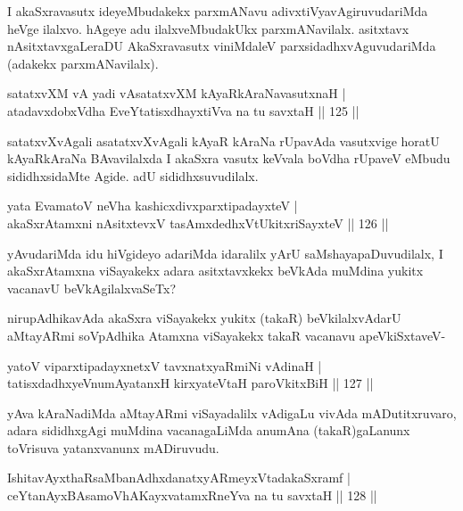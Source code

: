 \begin{artha}
I akaSxravasutx ideyeMbudakekx parxmANavu adivxtiVyavAgiruvudariMda heVge ilalxvo. hAgeye adu ilalxveMbudakUkx parxmANavilalx. asitxtavx nAsitxtavxgaLeraDU AkaSxravasutx viniMdaleV parxsidadhxvAguvudariMda (adakekx parxmANavilalx).
\end{artha}

\begin{shl}
satatxvXM vA yadi vA\s satatxvXM kAyaRkAraNavasutxnaH |\\
atadavxdobxVdha EveYtatisxdhayxtiVva na tu savxtaH \hfill || 125 ||
\end{shl}

\begin{artha}%
satatxvXvAgali asatatxvXvAgali kAyaR kAraNa rUpavAda vasutxvige horatU kAyaRkAraNa BAvavilalxda I akaSxra vasutx keVvala boVdha rUpaveV eMbudu sididhxsidaMte Agide. adU sididhxsuvudilalx.
\end{artha}


\begin{shl}
yata EvamatoV neVha kashicxdivxparxtipadayxteV |\\
akaSxrAtamxni nAsitxtevxV tasAmxdedhxVtUkitxriSayxteV \hfill || 126 ||
\end{shl}

\begin{artha}
yAvudariMda idu hiVgideyo adariMda idaralilx yArU saMshayapaDuvudilalx, I akaSxrAtamxna viSayakekx adara asitxtavxkekx beVkAda muMdina yukitx vacanavU beVkAgilalxvaSeTx?

nirupAdhikavAda akaSxra viSayakekx yukitx (takaR) beVkilalxvAdarU aMtayARmi soVpAdhika Atamxna viSayakekx takaR vacanavu apeVkiSxtaveV-
\end{artha}

\begin{shl}
yatoV viparxtipadayxnetxV tavxnatxyaRmiNi vAdinaH |\\
tatisxdadhxyeV\s numAyatanxH kirxyateV\s taH paroVkitxBiH \hfill || 127 ||
\end{shl}

\begin{artha}
yAva kAraNadiMda aMtayARmi viSayadalilx vAdigaLu vivAda mADutitxruvaro, adara sididhxgAgi muMdina vacanagaLiMda anumAna (takaR)gaLanunx toVrisuva yatanxvanunx mADiruvudu.
\end{artha}

\begin{shl}
IshitavAyxthaRsaMbanAdhxdanatxyARmeyxVtadakaSxramf |\\
ceYtanAyxBAsamoVhAKayxvatamxRneYva na tu savxtaH \hfill || 128 ||
\end{shl}

